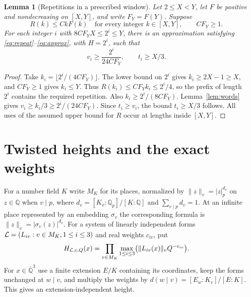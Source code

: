 \documentclass[11pt]{article}
\numberwithin{equation}{section}
\newtheorem{lemma}[theorem]{Lemma}
\theoremstyle{remark}\newtheorem{remark}[theorem]{Remark}
\newcommand{\Q}{\mathbb Q}\newcommand{\Z}{\mathbb Z}
\newcommand{\Qbar}{\overline{\mathbb Q}}
\begin{document}
\begin{lemma}[Repetitions in a prescribed window]\label{lem:windowwords}
Let $2\le X<Y$, let $F$ be positive and nondecreasing on $[X,Y]$, and
write $F_Y=F(Y)$. Suppose
\[
 R(k)\le CkF(k)\quad\text{for every integer }k\in[X,Y],
 \qquad CF_Y\ge1.
\]
For each integer $i$ with $8CF_YX\le2^i\le Y$, there is an
approximation satisfying \eqref{eq:repeat}--\eqref{eq:approx}, with
$H=2^i$, such that
\begin{equation}\label{eq:windowwords}
 v_i\ge\frac{2^i}{24CF_Y},\qquad t_i\ge X/3.
\end{equation}
\end{lemma}
\begin{proof}
Take $k_i=\lfloor2^i/(4CF_Y)\rfloor$. The lower bound on $2^i$ gives
$k_i\ge2X-1\ge X$, and $CF_Y\ge1$ gives $k_i\le Y$.
Thus $R(k_i)\le CF_Yk_i\le2^i/4$, so the prefix of length $2^i$
contains the required repetition. Also
$k_i\ge2^i/(8CF_Y)$. Lemma~\ref{lem:words} gives
$v_i\ge k_i/3\ge2^i/(24CF_Y)$. Since $t_i\ge v_i$,
the bound $t_i\ge X/3$ follows. All uses of the assumed upper bound
for $R$ occur at lengths inside $[X,Y]$.
\end{proof}

\section{Twisted heights and the exact weights}\label{sec:height}
For a number field $K$ write $M_K$ for its places, normalized by
$\|z\|_v=|z|_p^{d_v}$ on $z\in\Q$ when $v\mid p$, where
$d_v=[K_v:\Q_p]/[K:\Q]$ and $\sum_{v\mid p}d_v=1$.
At an infinite place represented by an embedding $\sigma_v$ the
corresponding formula is $\|z\|_v=|\sigma_v(z)|^{d_v}$.
For a system of linearly independent forms
$\mathcal L=(L_{iv}:v\in M_K,1\le i\le3)$ and real weights $c_{iv}$, put
\begin{equation}\label{eq:height}
 H_{\mathcal L,c,Q}(x)=\prod_{v\in M_K}
 \max_{1\le i\le3}\bigl(\|L_{iv}(x)\|_vQ^{-c_{iv}}\bigr).
\end{equation}
For $x\in\Qbar^3$ use a finite extension $E/K$ containing its coordinates,
keep the forms unchanged at $w\mid v$, and multiply the weights by
$d(w\mid v)=[E_w:K_v]/[E:K]$. This gives an extension-independent height.
\end{document}

